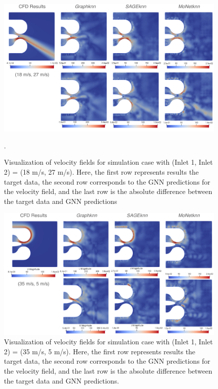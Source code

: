 \begin{figure}[ht]
    \centering
    \includegraphics[width=14cm]{images/Methodology/Asset 17.png}
    \caption{Visualization of velocity fields for simulation case with (Inlet 1, Inlet 2) = (18 m/s, 27 m/s). Here, the first row represents results the target data, the second row corresponds to the GNN predictions for the velocity field, and the last row is the absolute difference between the target data and GNN predictions}. 
    \label{allvel2}
\end{figure}
\begin{figure}[ht]
    \centering
    \includegraphics[width=14cm]{images/Methodology/Asset 15.png}
    \caption{Visualization of velocity fields for simulation case with (Inlet 1, Inlet 2) = (35 m/s, 5 m/s). Here, the first row represents results the target data, the second row corresponds to the GNN predictions for the velocity field, and the last row is the absolute difference between the target data and GNN predictions.} 
    \label{allvel3}
\end{figure}
